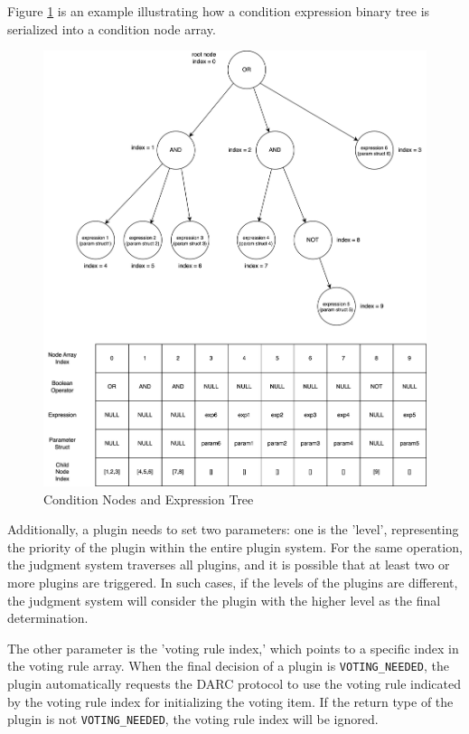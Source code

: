 \documentclass[main.tex]{subfiles}
\begin{document}
Figure \ref{fig:condition-nodes} is an example illustrating how a condition expression binary tree is serialized into a condition node array.

\begin{figure}
\centering
\includegraphics[width=1\linewidth]{plugin_condition_nodes.drawio.png}
\caption{\label{fig:condition-nodes}Condition Nodes and Expression Tree}
\end{figure}

Additionally, a plugin needs to set two parameters: one is the 'level', representing the priority of the plugin within the entire plugin system. For the same operation, the judgment system traverses all plugins, and it is possible that at least two or more plugins are triggered. In such cases, if the levels of the plugins are different, the judgment system will consider the plugin with the higher level as the final determination.

The other parameter is the 'voting rule index,' which points to a specific index in the voting rule array. When the final decision of a plugin is \texttt{VOTING\_NEEDED}, the plugin automatically requests the DARC protocol to use the voting rule indicated by the voting rule index for initializing the voting item. If the return type of the plugin is not \texttt{VOTING\_NEEDED}, the voting rule index will be ignored.
\end{document}
